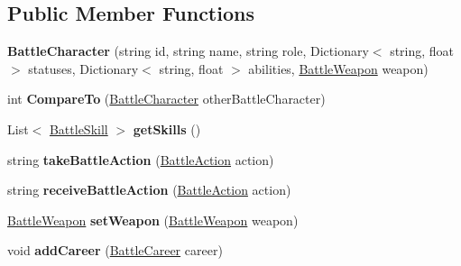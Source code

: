 \subsection*{Public Member Functions}
\begin{DoxyCompactItemize}
\item 
{\bfseries Battle\+Character} (string id, string name, string role, Dictionary$<$ string, float $>$ statuses, Dictionary$<$ string, float $>$ abilities, \hyperlink{class_battle_weapon}{Battle\+Weapon} weapon)\hypertarget{class_battle_character_a76c7ff8ed41a24b2acd445219546743b}{}\label{class_battle_character_a76c7ff8ed41a24b2acd445219546743b}

\item 
int {\bfseries Compare\+To} (\hyperlink{class_battle_character}{Battle\+Character} other\+Battle\+Character)\hypertarget{class_battle_character_a1f079054d3c78bd6bb49320a9d0d85e4}{}\label{class_battle_character_a1f079054d3c78bd6bb49320a9d0d85e4}

\item 
List$<$ \hyperlink{class_battle_skill}{Battle\+Skill} $>$ {\bfseries get\+Skills} ()\hypertarget{class_battle_character_a883e1a0a7dcad2ce29ac10faa3042fd1}{}\label{class_battle_character_a883e1a0a7dcad2ce29ac10faa3042fd1}

\item 
string {\bfseries take\+Battle\+Action} (\hyperlink{class_battle_action}{Battle\+Action} action)\hypertarget{class_battle_character_add0ddbd8794a862ab463b55a9c5ac925}{}\label{class_battle_character_add0ddbd8794a862ab463b55a9c5ac925}

\item 
string {\bfseries receive\+Battle\+Action} (\hyperlink{class_battle_action}{Battle\+Action} action)\hypertarget{class_battle_character_a2f987bc1bfbcbb023c819ec875295a47}{}\label{class_battle_character_a2f987bc1bfbcbb023c819ec875295a47}

\item 
\hyperlink{class_battle_weapon}{Battle\+Weapon} {\bfseries set\+Weapon} (\hyperlink{class_battle_weapon}{Battle\+Weapon} weapon)\hypertarget{class_battle_character_a7f53d6f9f9e6b43716c2cddfc25a70f9}{}\label{class_battle_character_a7f53d6f9f9e6b43716c2cddfc25a70f9}

\item 
void {\bfseries add\+Career} (\hyperlink{class_battle_career}{Battle\+Career} career)\hypertarget{class_battle_character_a037ed1ed5327a1f72a8fbde46c660b29}{}\label{class_battle_character_a037ed1ed5327a1f72a8fbde46c660b29}

\end{DoxyCompactItemize}
